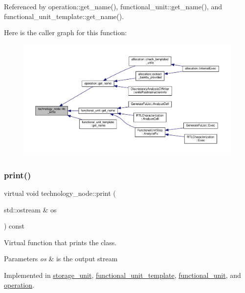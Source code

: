 Referenced by operation\+::get\+\_\+name(), functional\+\_\+unit\+::get\+\_\+name(), and functional\+\_\+unit\+\_\+template\+::get\+\_\+name().

Here is the caller graph for this function\+:
\nopagebreak
\begin{figure}[H]
\begin{center}
\leavevmode
\includegraphics[width=350pt]{df/d06/structtechnology__node_a7e56b3bd8c693bb664fae9e5538b2526_icgraph}
\end{center}
\end{figure}
\mbox{\label{structtechnology__node_a44f347bae9b9b59726f323b5a6ad9ebf}} 
\subsubsection{\texorpdfstring{print()}{print()}}
{\footnotesize\ttfamily virtual void technology\+\_\+node\+::print (\begin{DoxyParamCaption}\item[{std\+::ostream \&}]{os }\end{DoxyParamCaption}) const\hspace{0.3cm}{\ttfamily [pure virtual]}}



Virtual function that prints the class. 


\begin{DoxyParams}{Parameters}
{\em os} & is the output stream \\
\hline
\end{DoxyParams}


Implemented in \hyperlink{structstorage__unit_a8c2a91597aa05ac41cd71a5df907fd8f}{storage\+\_\+unit}, \hyperlink{structfunctional__unit__template_a4618e5113fff69a045ebc7f974e843b2}{functional\+\_\+unit\+\_\+template}, \hyperlink{structfunctional__unit_a2ab8e656144661fc27df14e7d5649dde}{functional\+\_\+unit}, and \hyperlink{structoperation_a48582638c55f54db175299d504459f70}{operation}.



